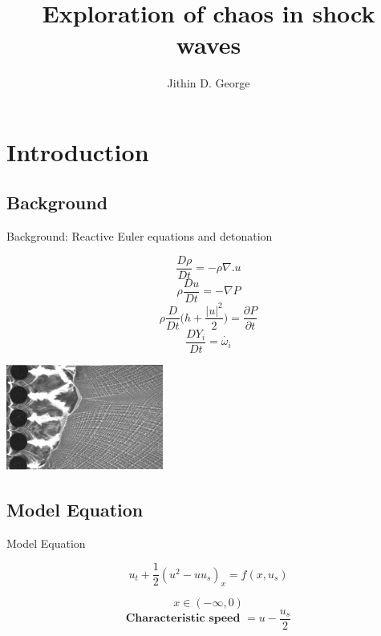 \documentclass{beamer}
\title[Your Short Title]{Exploration of chaos in shock waves}
\author{Jithin D. George}
\begin{document}
\begin{frame}
  \titlepage
\end{frame}


\section{Introduction}

\subsection{Background}
\begin{frame}{Background: Reactive Euler equations and detonation }

	\[\frac{D\rho}{Dt}=-\rho \nabla . u\]
	\[\rho\frac{Du}{Dt}=- \nabla P\]
	\[\rho\frac{D}{Dt}\bigg(h+\frac{|u|^2}{2}\bigg)=\frac{\partial P}{\partial t}\]
	\[\frac{DY_i}{Dt}=\dot{\omega_i}\]
	  \begin{center}
	  	\includegraphics[height=100pt]{detonation}\\
	  	
	  \end{center}
\end{frame}	
\subsection{Model Equation}
\begin{frame}{Model Equation}


  \[u_t +\frac{1}{2}(u^2-uu_s)_x =f(x,u_s) \]

    \[x\in (-\infty,0)\]
    \[\textbf{Characteristic speed } = u-\frac{u_s}{2}\]

  






\end{frame}
\end{document}
